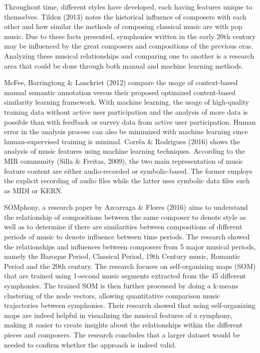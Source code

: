 Throughout time, different styles have developed, each having features unique to themselves. Tilden (2013) notes the historical influence of composers with each other and how similar the methods of composing classical music are with pop music.  Due to these facts presented, symphonies written in the early 20th century may be influenced by the great composers and compositions of the previous eras. Analyzing these musical relationships and comparing one to another is a research area that could be done through both manual and machine learning methods.

McFee, Barringtong \& Lanckriet (2012) compare the usage of context-based manual semantic annotation versus their proposed optimized content-based similarity learning framework. With machine learning, the usage of high-quality training data without active user participation and the analysis of more data is possible than with feedback or survey data from active user participation. Human error in the analysis process can also be minimized with machine learning since human-supervised training is minimal. Corrêa \& Rodrigues (2016) shows the analysis of music features using machine learning techniques. According to the MIR community (Silla \& Freitas, 2009), the two main representation of music feature content are either audio-recorded or symbolic-based. The former employs the explicit recording of audio files while the latter uses symbolic data files such as MIDI or KERN.

SOMphony, a research paper by Azcarraga \& Flores (2016) aims to understand the relationship of compositions between the same composer to denote style as well as to determine if there are similarities between compositions of different periods of music to denote influence between time periods. The research showed the relationships and influences between composers from 5 major musical periods, namely the Baroque Period, Classical Period, 19th Century music, Romantic Period and the 20th century. The research focuses on self-organizing maps (SOM) that are trained using 1-second music segments extracted from the 45 different symphonies. The trained SOM is then further processed by doing a k-means clustering of the node vectors, allowing quantitative comparison music trajectories between symphonies. Their research showed that using self-organizing maps are indeed helpful in visualizing the musical features of a symphony, making it easier to create insights about the relationships within the different pieces and composers. The research concludes that a larger dataset would be needed to confirm whether the approach is indeed valid. 

